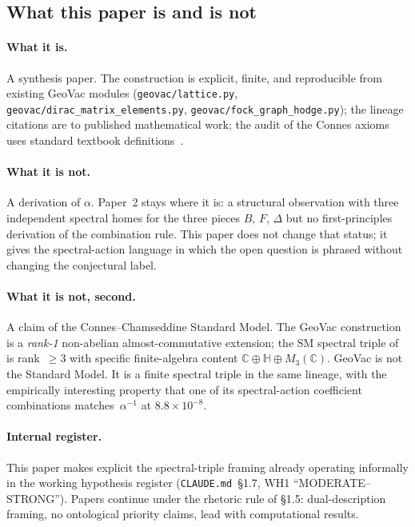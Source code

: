 \documentclass[11pt]{article}
\begin{document}
\subsection{What this paper is and is not}

\paragraph{What it is.}  A synthesis paper.  The construction is
explicit, finite, and reproducible from existing GeoVac modules
(\texttt{geovac/lattice.py}, \texttt{geovac/dirac\_matrix\_elements.py},
\texttt{geovac/fock\_graph\_hodge.py}); the lineage citations are to
published mathematical work; the audit of the Connes axioms uses
standard textbook definitions~\cite{connes1995,connes_marcolli2008,%
suijlekom_book2015}.

\paragraph{What it is not.}  A derivation of $\alpha$.  Paper~2 stays
where it is: a structural observation with three independent spectral
homes for the three pieces $B$, $F$, $\Delta$ but no first-principles
derivation of the combination rule.  This paper does not change that
status; it gives the spectral-action language in which the open
question is phrased without changing the conjectural label.

\paragraph{What it is not, second.}  A claim of the
Connes--Chamseddine Standard Model.  The GeoVac construction is a
\emph{rank-1} non-abelian almost-commutative extension; the SM
spectral triple of \cite{chamseddine_connes2010} is rank~$\ge 3$ with
specific finite-algebra content $\mathbb{C} \oplus \mathbb{H} \oplus
M_3(\mathbb{C})$.  GeoVac is not the Standard Model.  It is a finite
spectral triple in the same lineage, with the empirically interesting
property that one of its spectral-action coefficient combinations
matches~$\alpha^{-1}$ at $8.8 \times 10^{-8}$.

\paragraph{Internal register.}  This paper makes explicit the
spectral-triple framing already operating informally in the working
hypothesis register (\texttt{CLAUDE.md}~\S 1.7, WH1 ``MODERATE--STRONG'').
Papers continue under the rhetoric rule of \S 1.5: dual-description
framing, no ontological priority claims, lead with computational
results.
\end{document}
